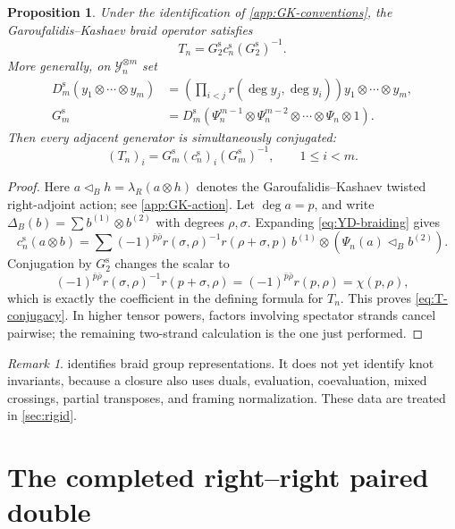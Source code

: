 \documentclass[11pt,a4paper]{article}
\newcommand{\ot}{\otimes}
\newcommand{\tri}{\mathbin{\triangleleft}}
\newtheorem{proposition}[theorem]{Proposition}
\theoremstyle{definition}
\theoremstyle{remark}
\newtheorem{remark}[theorem]{Remark}
\begin{document}
\begin{proposition}\label{prop:braid-gauge}
Under the identification of \cref{app:GK-conventions}, the
Garoufalidis--Kashaev braid operator satisfies
\begin{equation}\label{eq:T-conjugacy}
 T_n=G_2^{\mathrm s}c_n^{\mathrm s}(G_2^{\mathrm s})^{-1}.
\end{equation}
More generally, on \(\mathcal Y_n^{\ot m}\) set
\[
\begin{aligned}
 D_m^{\mathrm s}(y_1\ot\cdots\ot y_m)
 &=
 \left(\prod_{i<j}r(\deg y_j,\deg y_i)\right)
 y_1\ot\cdots\ot y_m,\\
 G_m^{\mathrm s}
 &=D_m^{\mathrm s}
 (\Psi_n^{m-1}\ot\Psi_n^{m-2}\ot\cdots\ot\Psi_n\ot1).
\end{aligned}
\]
Then every adjacent generator is simultaneously conjugated:
\begin{equation}\label{eq:all-braid-gauge}
 (T_n)_i=G_m^{\mathrm s}(c_n^{\mathrm s})_i
 (G_m^{\mathrm s})^{-1},\qquad 1\leq i<m.
\end{equation}
\end{proposition}

\begin{proof}
Here \(a\tri_B h=\lambda_R(a\ot h)\) denotes the
Garoufalidis--Kashaev twisted right-adjoint action; see
\cref{app:GK-action}.  Let \(\deg a=p\), and write
\(\Delta_B(b)=\sum b^{(1)}\ot b^{(2)}\) with degrees
\(\rho,\sigma\).  Expanding \eqref{eq:YD-braiding} gives
\[
 c_n^{\mathrm s}(a\ot b)
 =\sum(-1)^{\bar p\bar\rho}
 r(\sigma,\rho)^{-1}r(\rho+\sigma,p)\,
 b^{(1)}\ot(\Psi_n(a)\tri_B b^{(2)}).
\]
Conjugation by \(G_2^{\mathrm s}\) changes the scalar to
\[
 (-1)^{\bar p\bar\rho}
 r(\sigma,\rho)^{-1}r(p+\sigma,\rho)
 =(-1)^{\bar p\bar\rho}r(p,\rho)
 =\chi(p,\rho),
\]
which is exactly the coefficient in the defining formula for \(T_n\).
This proves \eqref{eq:T-conjugacy}.  In higher tensor powers, factors
involving spectator strands cancel pairwise; the remaining two-strand
calculation is the one just performed.
\end{proof}

\begin{remark}\label{rem:braids-not-knots}
 identifies braid group representations.  It does
not yet identify knot invariants, because a closure also uses duals,
evaluation, coevaluation, mixed crossings, partial transposes, and
framing normalization.  These data are treated in \cref{sec:rigid}.
\end{remark}

\section{The completed right--right paired double}\label{sec:double}
\end{document}
